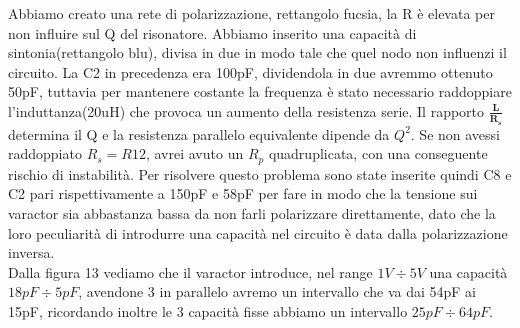 \documentclass{article}
\begin{document}
Abbiamo creato una rete di polarizzazione, rettangolo fucsia, la R è elevata per non influire sul Q del risonatore.
Abbiamo inserito una capacità di sintonia(rettangolo blu), divisa in due in modo tale che quel nodo non influenzi il circuito.
La C2 in precedenza era 100pF, dividendola in due avremmo ottenuto 50pF, tuttavia per mantenere costante la frequenza è stato necessario raddoppiare l'induttanza(20uH) che provoca un aumento della resistenza serie.
Il rapporto \LARGE$\bm{\frac{L}{R_s}}$ \normalsize determina il Q e la resistenza parallelo equivalente dipende da $Q^2$.
Se non avessi raddoppiato $R_s=R12$, avrei avuto un $R_p$ quadruplicata, con una conseguente rischio di instabilità.
Per risolvere questo problema sono state inserite quindi C8 e C2 pari rispettivamente a 150pF e 58pF per fare in modo che la tensione sui varactor sia abbastanza bassa da non farli polarizzare direttamente, dato che la loro peculiarità di introdurre una capacità nel circuito è data dalla polarizzazione inversa.\\Dalla figura 13 vediamo che il varactor introduce, nel range $1V \div 5V$ una capacità $18pF \div 5pF$, avendone 3 in parallelo avremo un intervallo che va dai 54pF ai 15pF, ricordando inoltre le 3 capacità fisse abbiamo un intervallo $25pF \div 64pF$.

\newpage
\end{document}
